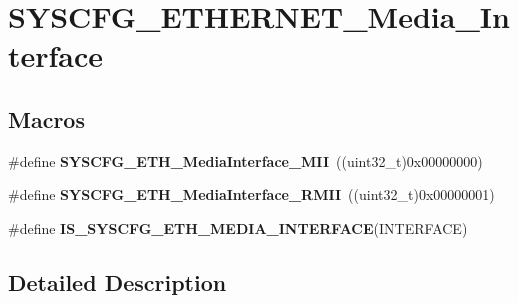 \hypertarget{group___s_y_s_c_f_g___e_t_h_e_r_n_e_t___media___interface}{\section{S\-Y\-S\-C\-F\-G\-\_\-\-E\-T\-H\-E\-R\-N\-E\-T\-\_\-\-Media\-\_\-\-Interface}
\label{group___s_y_s_c_f_g___e_t_h_e_r_n_e_t___media___interface}
}
\subsection*{Macros}
\begin{DoxyCompactItemize}
\item 
\hypertarget{group___s_y_s_c_f_g___e_t_h_e_r_n_e_t___media___interface_ga07d3a311515069bb26e8f84febc80494}{\#define {\bfseries S\-Y\-S\-C\-F\-G\-\_\-\-E\-T\-H\-\_\-\-Media\-Interface\-\_\-\-M\-I\-I}~((uint32\-\_\-t)0x00000000)}\label{group___s_y_s_c_f_g___e_t_h_e_r_n_e_t___media___interface_ga07d3a311515069bb26e8f84febc80494}

\item 
\hypertarget{group___s_y_s_c_f_g___e_t_h_e_r_n_e_t___media___interface_ga0608a8f6380bcf7de7c87dd331740857}{\#define {\bfseries S\-Y\-S\-C\-F\-G\-\_\-\-E\-T\-H\-\_\-\-Media\-Interface\-\_\-\-R\-M\-I\-I}~((uint32\-\_\-t)0x00000001)}\label{group___s_y_s_c_f_g___e_t_h_e_r_n_e_t___media___interface_ga0608a8f6380bcf7de7c87dd331740857}

\item 
\#define {\bfseries I\-S\-\_\-\-S\-Y\-S\-C\-F\-G\-\_\-\-E\-T\-H\-\_\-\-M\-E\-D\-I\-A\-\_\-\-I\-N\-T\-E\-R\-F\-A\-C\-E}(I\-N\-T\-E\-R\-F\-A\-C\-E)
\end{DoxyCompactItemize}


\subsection{Detailed Description}


